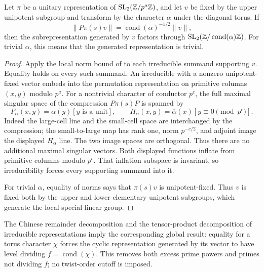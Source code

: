 \begin{lemma}
\label{lem:creative-local-conductor}
Let $\pi$ be a unitary representation of
$\mathrm{SL}_2(\mathbb Z/p^a\mathbb Z)$, and let $v$ be fixed by the upper
unipotent subgroup and transform by the character $\alpha$ under the
diagonal torus. If
\[
 \|P\pi(s)v\|=\operatorname{cond}(\alpha)^{-1/2}\|v\|,
\]
then the subrepresentation generated by $v$ factors through
$\mathrm{SL}_2(\mathbb Z/\operatorname{cond}(\alpha)\mathbb Z)$.
For trivial $\alpha$, this means that the generated representation is
trivial.
\end{lemma}
\begin{proof}
Apply the local norm bound of
\cite[Lemma~4.1]{SchopierayDimensionBlock} to each irreducible
summand supporting $v$. Equality holds on every such summand.
An irreducible with a nonzero unipotent-fixed vector embeds into the
permutation representation on primitive columns $(x,y)$ modulo $p^a$.
For a nontrivial character of conductor $p^c$, the full maximal
singular space of the compression $P\pi(s)P$ is spanned by
\[
 F_\alpha(x,y)=\alpha(y)[y\text{ is a unit}],\qquad
 H_\alpha(x,y)=\overline{\alpha}(x)[y\equiv0\pmod{p^c}].
\]
Indeed the large-cell line and the small-cell space are interchanged
by the compression; the small-to-large map has rank one, norm
$p^{-c/2}$, and adjoint image the displayed $H_\alpha$ line.
The two image spaces are orthogonal. Thus there are no additional
maximal singular vectors. Both displayed functions inflate from
primitive columns modulo $p^c$. That inflation subspace is invariant,
so irreducibility forces every supporting summand into it.

For trivial $\alpha$, equality of norms says that $\pi(s)v$ is
unipotent-fixed. Thus $v$ is fixed both by the upper and lower
elementary unipotent subgroups, which generate the local special
linear group.
\end{proof}

The Chinese remainder decomposition and the tensor-product
decomposition of irreducible representations imply the corresponding
global result: equality for a torus character $\chi$ forces the cyclic
representation generated by its vector to have level dividing
$f=\operatorname{cond}(\chi)$. This removes both excess prime powers
and primes not dividing $f$; no twist-order cutoff is imposed.

